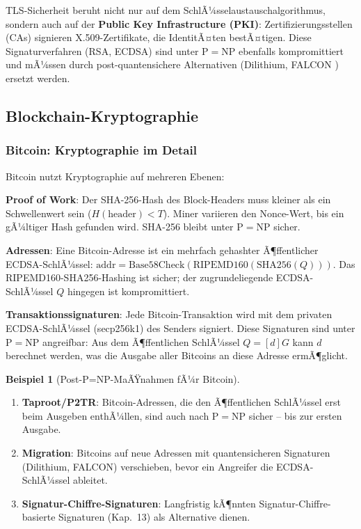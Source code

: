 ﻿\documentclass[a4paper,12pt]{scrreprt}
\theoremstyle{definition}
\newtheorem{beispiel}{Beispiel}[section]
\begin{document}
TLS-Sicherheit beruht nicht nur auf dem SchlÃ¼sselaustauschalgorithmus, sondern auch auf der \textbf{Public Key Infrastructure (PKI)}: Zertifizierungsstellen (CAs) signieren X.509-Zertifikate, die IdentitÃ¤ten bestÃ¤tigen. Diese Signaturverfahren (RSA, ECDSA) sind unter $\mathrm{P}=\mathrm{NP}$ ebenfalls kompromittiert und mÃ¼ssen durch post-quantensichere Alternativen (Dilithium, FALCON \cite{NIST22}) ersetzt werden.

\subsection{Blockchain-Kryptographie}

\subsubsection{Bitcoin: Kryptographie im Detail}

Bitcoin \cite{Nak08} nutzt Kryptographie auf mehreren Ebenen:

\textbf{Proof of Work}: Der SHA-256-Hash des Block-Headers muss kleiner als ein Schwellenwert sein ($H(\text{header}) < T$). Miner variieren den Nonce-Wert, bis ein gÃ¼ltiger Hash gefunden wird. SHA-256 bleibt unter $\mathrm{P}=\mathrm{NP}$ sicher.

\textbf{Adressen}: Eine Bitcoin-Adresse ist ein mehrfach gehashter Ã¶ffentlicher ECDSA-SchlÃ¼ssel: $\mathrm{addr} = \mathrm{Base58Check}(\mathrm{RIPEMD160}(\mathrm{SHA256}(Q)))$. Das RIPEMD160-SHA256-Hashing ist sicher; der zugrundeliegende ECDSA-SchlÃ¼ssel $Q$ hingegen ist kompromittiert.

\textbf{Transaktionssignaturen}: Jede Bitcoin-Transaktion wird mit dem privaten ECDSA-SchlÃ¼ssel (secp256k1) des Senders signiert. Diese Signaturen sind unter $\mathrm{P}=\mathrm{NP}$ angreifbar: Aus dem Ã¶ffentlichen SchlÃ¼ssel $Q = [d]G$ kann $d$ berechnet werden, was die Ausgabe aller Bitcoins an diese Adresse ermÃ¶glicht.

\begin{beispiel}[Post-P=NP-MaÃŸnahmen fÃ¼r Bitcoin]
\begin{enumerate}
    \item \textbf{Taproot/P2TR}: Bitcoin-\newline Adressen, die den Ã¶ffentlichen SchlÃ¼ssel erst beim Ausgeben enthÃ¼llen, sind auch nach $\mathrm{P}=\mathrm{NP}$ sicher -- bis zur ersten Ausgabe.
    \item \textbf{Migration}: Bitcoins auf neue Adressen mit quantensicheren Signaturen (Dilithium, FALCON) verschieben, bevor ein Angreifer die ECDSA-SchlÃ¼ssel ableitet.
    \item \textbf{Signatur-Chiffre-Signaturen}: Langfristig kÃ¶nnten Signatur-Chiffre-basierte Signaturen (Kap.~13) als Alternative dienen.
\end{enumerate}
\end{beispiel}
\end{document}
